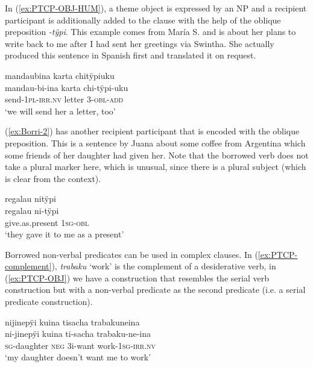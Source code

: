 In (\ref{ex:PTCP-OBJ-HUM}), a theme object is expressed by an NP and a recipient participant is additionally added to the clause with the help of the oblique preposition \textit{-tÿpi}. This example comes from María S. and is about her plans to write back to me after I had sent her greetings via Swintha. She actually produced this sentence in Spanish first and translated it on request.

\ea\label{ex:PTCP-OBJ-HUM}
\begingl 
\glpreamble mandaubina karta chitÿpiuku\\
\gla mandau-bi-ina karta chi-tÿpi-uku\\ 
\glb send-1\textsc{pl}-\textsc{irr.nv} letter 3-\textsc{obl}-\textsc{add}\\ 
\glft ‘we will send her a letter, too’
\trailingcitation{[rxx-e121128s-1.115]}
\xe


(\ref{ex:Borri-2}) has another recipient participant that is encoded with the oblique preposition. This is a sentence by Juana about some coffee from Argentina which some friends of her daughter had given her. Note that the borrowed verb does not take a plural marker here, which is unusual, since there is a plural subject (which is clear from the context).

\ea\label{ex:Borri-2}
\begingl
\glpreamble regalau nitÿpi\\
\gla regalau ni-tÿpi\\
\glb give.as.present 1\textsc{sg}-\textsc{obl}\\
\glft ‘they gave it to me as a present’
\endgl
\trailingcitation{[jxx-e120430l-4.29]}
\xe
{}

Borrowed non-verbal predicates can be used in complex clauses. In (\ref{ex:PTCP-complement}), \textit{trabaku} ‘work’ is the complement of a desiderative verb, in (\ref{ex:PTCP-OBJ}) we have a construction that resembles the serial verb construction but with a non-verbal predicate as the second predicate (i.e. a serial predicate construction).

\ea\label{ex:PTCP-complement}
\begingl 
\glpreamble nijinepÿi kuina tisacha trabakuneina\\
\gla ni-jinepÿi kuina ti-sacha trabaku-ne-ina\\ 
\textsc{sg}-daughter \textsc{neg} 3i-want work-1\textsc{sg}-\textsc{irr.nv}\\ 
\glft ‘my daughter doesn't want me to work’
\trailingcitation{[jxx-n101013s-1.193-194]}
\xe

